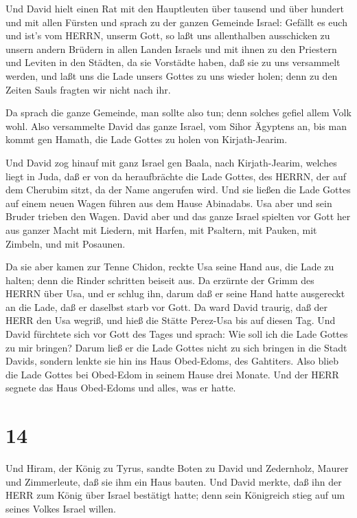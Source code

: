  Und David hielt einen Rat mit den Hauptleuten über tausend
und über hundert und mit allen Fürsten  und sprach zu der
ganzen Gemeinde Israel: Gefällt es euch und ist's vom HERRN, unserm
Gott, so laßt uns allenthalben ausschicken zu unsern andern Brüdern in
allen Landen Israels und mit ihnen zu den Priestern und Leviten in den
Städten, da sie Vorstädte haben, daß sie zu uns versammelt werden,
 und laßt uns die Lade unsers Gottes zu uns wieder holen;
denn zu den Zeiten Sauls fragten wir nicht nach ihr.

 Da sprach die ganze Gemeinde, man sollte also tun; denn
solches gefiel allem Volk wohl.  Also versammelte David das
ganze Israel, vom Sihor Ägyptens an, bis man kommt gen Hamath, die Lade
Gottes zu holen von Kirjath-Jearim.

 Und David zog hinauf mit ganz Israel gen Baala, nach
Kirjath-Jearim, welches liegt in Juda, daß er von da heraufbrächte die
Lade Gottes, des HERRN, der auf dem Cherubim sitzt, da der Name
angerufen wird.  Und sie ließen die Lade Gottes auf einem
neuen Wagen führen aus dem Hause Abinadabs. Usa aber und sein Bruder
trieben den Wagen.  David aber und das ganze Israel spielten
vor Gott her aus ganzer Macht mit Liedern, mit Harfen, mit Psaltern, mit
Pauken, mit Zimbeln, und mit Posaunen.

 Da sie aber kamen zur Tenne Chidon, reckte Usa seine Hand
aus, die Lade zu halten; denn die Rinder schritten beiseit aus.
 Da erzürnte der Grimm des HERRN über Usa, und er schlug
ihn, darum daß er seine Hand hatte ausgereckt an die Lade, daß er
daselbst starb vor Gott.  Da ward David traurig, daß der
HERR den Usa wegriß, und hieß die Stätte Perez-Usa bis auf diesen Tag.
 Und David fürchtete sich vor Gott des Tages und sprach:
Wie soll ich die Lade Gottes zu mir bringen?  Darum ließ er
die Lade Gottes nicht zu sich bringen in die Stadt Davids, sondern
lenkte sie hin ins Haus Obed-Edoms, des Gahtiters.  Also
blieb die Lade Gottes bei Obed-Edom in seinem Hause drei Monate. Und der
HERR segnete das Haus Obed-Edoms und alles, was er hatte.

\hypertarget{section-13}{%
\section{14}\label{section-13}}

 Und Hiram, der König zu Tyrus, sandte Boten zu David und
Zedernholz, Maurer und Zimmerleute, daß sie ihm ein Haus bauten.
 Und David merkte, daß ihn der HERR zum König über Israel
bestätigt hatte; denn sein Königreich stieg auf um seines Volkes Israel
willen.

